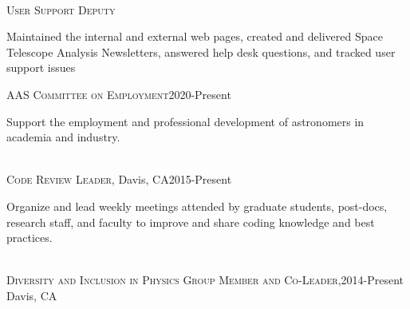 \documentclass[10pt]{cv}
\begin{document}
\begin{llist}
\\
\textsc{User Support Deputy}\\
\begin{minipage}[l]{0.7\textwidth}\vspace{0.15cm}
Maintained the internal and external web pages, created and delivered Space Telescope Analysis Newsletters, answered help desk questions, and tracked user support issues\\
\end{minipage}\vspace{0.15cm}
\textsc{AAS Committee on Employment}\hfill 2020-Present\\
\begin{minipage}[l]{0.7\textwidth}\vspace{0.15cm}
Support the employment and professional development of astronomers in academia and industry.\\
\end{minipage}\vspace{0.15cm}
\\
\textsc{Code Review Leader}, Davis, CA\hfill 2015-Present\\
\begin{minipage}[l]{0.7\textwidth}\vspace{0.15cm}
Organize and lead weekly meetings attended by graduate students, post-docs, research staff, and faculty to improve and share coding knowledge and best practices.\\
\end{minipage}\vspace{0.15cm}
\\
\textsc{Diversity and Inclusion in Physics Group Member and Co-Leader,}\hfill 2014-Present\\
Davis, CA \\

\end{llist}
\end{document}
